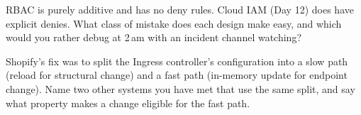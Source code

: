 \begin{thinkbox}
RBAC is purely additive and has no deny rules. Cloud IAM (Day 12) does have explicit denies. What class of mistake does each design make easy, and which would you rather debug at 2\,am with an incident channel watching?
\end{thinkbox}

\begin{thinkbox}
Shopify's fix was to split the Ingress controller's configuration into a slow path (reload for structural change) and a fast path (in-memory update for endpoint change). Name two other systems you have met that use the same split, and say what property makes a change eligible for the fast path.
\end{thinkbox}


